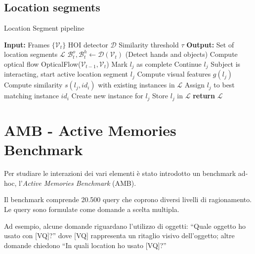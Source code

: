 \subsection*{Location segments}
\begin{algorithm}[H]
    \caption{Location Segment pipeline}
    \begin{algorithmic}[1]
    \State \textbf{Input:}
    \State \quad Frames $\{\mathcal{V}_t\}$
    \State \quad HOI detector $\mathcal{D}$
    \State \quad Similarity threshold $\tau$
    \State \textbf{Output:}
    \State \quad Set of location segments $\mathcal{L}$
        \State $\mathcal{B}_t^o, \mathcal{B}_t^h \gets \mathcal{D}(\mathcal{V}_t)$ (Detect hands and objects)
        \State Compute optical flow OpticalFlow($\mathcal{V}_{t-1}, \mathcal{V}_t$)
                \State Mark $l_j$ as complete
            \Else
                \State Continue $l_j$
            \EndIf
        \Else
                \State Subject is interacting, start active location segment $l_j$
            \EndIf
        \EndIf
    \EndFor
        \State Compute visual features $g(l_j)$
        \State Compute similarity $s(l_j, id_i)$ with existing instances in $\mathcal{L}$
            \State Assign $l_j$ to best matching instance $id_i$
        \Else
            \State Create new instance for $l_j$
        \EndIf
        \State Store $l_j$ in $\mathcal{L}$
    \EndFor
    \State \textbf{return} $\mathcal{L}$
    \end{algorithmic}
\end{algorithm}    


\section{AMB - Active Memories Benchmark}
Per studiare le interazioni dei vari elementi è stato introdotto un benchmark ad-hoc, l'\emph{Active Memories Benchmark} (AMB).

Il benchmark comprende 20.500 query che coprono diversi livelli di ragionamento. Le query sono formulate come domande a scelta multipla.

Ad esempio, alcune domande riguardano l'utilizzo di oggetti: ``Quale oggetto ho usato con [VQ]?'' dove [VQ] rappresenta un ritaglio visivo dell'oggetto; altre domande chiedono ``In quali location ho usato [VQ]?''

